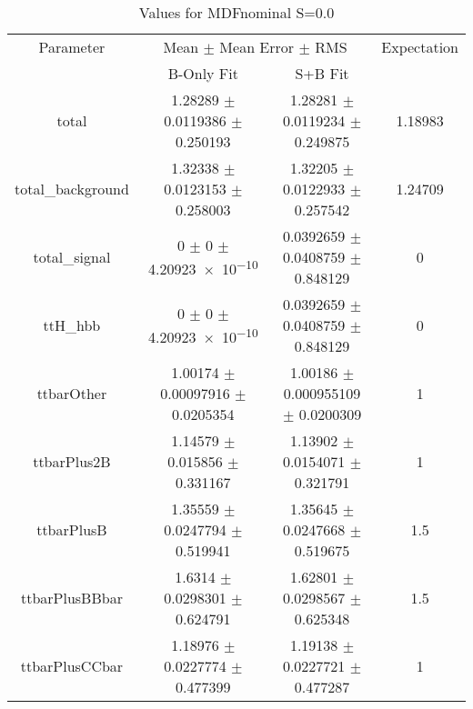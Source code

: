 \begin{table}
\centering
\caption{Values for MDFnominal S=0.0}
\begin{tabular}{cccc}
\toprule
Parameter & \multicolumn{2}{c}{Mean $\pm$ Mean Error $\pm$ RMS} & Expectation\\
 & B-Only Fit & S+B Fit & \\
\midrule
total & \num{1.28289} $\pm$ \num{0.0119386} $\pm$ \num{0.250193} & \num{1.28281} $\pm$ \num{0.0119234} $\pm$ \num{0.249875} & \num{1.18983}\\
total\_background & \num{1.32338} $\pm$ \num{0.0123153} $\pm$ \num{0.258003} & \num{1.32205} $\pm$ \num{0.0122933} $\pm$ \num{0.257542} & \num{1.24709}\\
total\_signal & \num{0} $\pm$ \num{0} $\pm$ \num{4.20923e-10} & \num{0.0392659} $\pm$ \num{0.0408759} $\pm$ \num{0.848129} & \num{0}\\
ttH\_hbb & \num{0} $\pm$ \num{0} $\pm$ \num{4.20923e-10} & \num{0.0392659} $\pm$ \num{0.0408759} $\pm$ \num{0.848129} & \num{0}\\
ttbarOther & \num{1.00174} $\pm$ \num{0.00097916} $\pm$ \num{0.0205354} & \num{1.00186} $\pm$ \num{0.000955109} $\pm$ \num{0.0200309} & \num{1}\\
ttbarPlus2B & \num{1.14579} $\pm$ \num{0.015856} $\pm$ \num{0.331167} & \num{1.13902} $\pm$ \num{0.0154071} $\pm$ \num{0.321791} & \num{1}\\
ttbarPlusB & \num{1.35559} $\pm$ \num{0.0247794} $\pm$ \num{0.519941} & \num{1.35645} $\pm$ \num{0.0247668} $\pm$ \num{0.519675} & \num{1.5}\\
ttbarPlusBBbar & \num{1.6314} $\pm$ \num{0.0298301} $\pm$ \num{0.624791} & \num{1.62801} $\pm$ \num{0.0298567} $\pm$ \num{0.625348} & \num{1.5}\\
ttbarPlusCCbar & \num{1.18976} $\pm$ \num{0.0227774} $\pm$ \num{0.477399} & \num{1.19138} $\pm$ \num{0.0227721} $\pm$ \num{0.477287} & \num{1}\\
\bottomrule
\end{tabular}
\end{table}